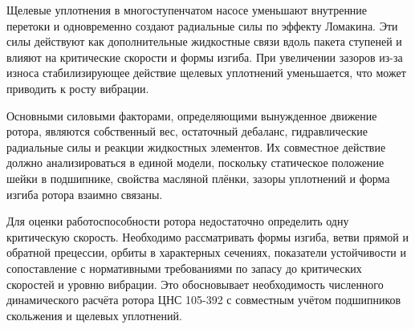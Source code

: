 Щелевые уплотнения в многоступенчатом насосе уменьшают внутренние перетоки и одновременно создают радиальные силы по эффекту Ломакина. Эти силы действуют как дополнительные жидкостные связи вдоль пакета ступеней и влияют на критические скорости и формы изгиба. При увеличении зазоров из-за износа стабилизирующее действие щелевых уплотнений уменьшается, что может приводить к росту вибрации.

Основными силовыми факторами, определяющими вынужденное движение ротора, являются собственный вес, остаточный дебаланс, гидравлические радиальные силы и реакции жидкостных элементов. Их совместное действие должно анализироваться в единой модели, поскольку статическое положение шейки в подшипнике, свойства масляной плёнки, зазоры уплотнений и форма изгиба ротора взаимно связаны.

Для оценки работоспособности ротора недостаточно определить одну критическую скорость. Необходимо рассматривать формы изгиба, ветви прямой и обратной прецессии, орбиты в характерных сечениях, показатели устойчивости и сопоставление с нормативными требованиями по запасу до критических скоростей и уровню вибрации. Это обосновывает необходимость численного динамического расчёта ротора ЦНС 105-392 с совместным учётом подшипников скольжения и щелевых уплотнений.
